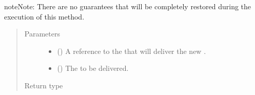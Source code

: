 \documentclass[letterpaper,10pt,english]{sphinxmanual}
\begin{document}
\begin{fulllineitems}
\begin{fulllineitems}
\begin{description}
\end{description}

\begin{sphinxadmonition}{note}{Note:}
There are no guarantees that
{\hyperref[\detokenize{app:app.environment_settings.REPLICATION_LEVEL}]{}} will be
completely restored during the execution of this method.
\end{sphinxadmonition}
\begin{quote}\begin{description}
\item[{Parameters}] \leavevmode\begin{itemize}
\item {} 
 ({\hyperref[\detokenize{app:app.type_hints.ClusterType}]{}}) \textendash{} A reference to the
{\hyperref[\detokenize{app.domain:app.domain.cluster_groups.Cluster}]{}} that will
deliver the new .

\item {} 
 ({\hyperref[\detokenize{app.domain.helpers:app.domain.helpers.smart_dataclasses.FileBlockData}]{}}) \textendash{} The {\hyperref[\detokenize{app.domain.helpers:app.domain.helpers.smart_dataclasses.FileBlockData}]{}}
to be delivered.

\end{itemize}

\item[{Return type}] \leavevmode
{}

\end{description}\end{quote}

\end{fulllineitems}



\end{fulllineitems}
\end{document}
